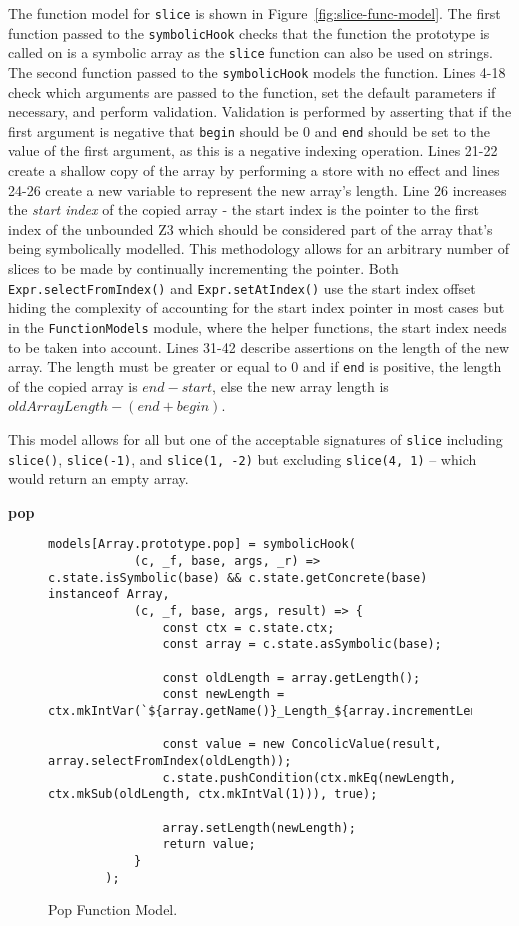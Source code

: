 \documentclass[]{final_report}
\begin{document}
The function model for \lstinline|slice| is shown in Figure~\ref{fig:slice-func-model}. The first function passed to the \lstinline|symbolicHook| checks that the function the prototype is called on is a symbolic array as the \lstinline|slice| function can also be used on strings. The second function passed to the \lstinline|symbolicHook| models the function. Lines 4-18 check which arguments are passed to the function, set the default parameters if necessary, and perform validation. Validation is performed by asserting that if the first argument is negative that \lstinline|begin| should be 0 and \lstinline|end| should be set to the value of the first argument, as this is a negative indexing operation. Lines 21-22 create a shallow copy of the array by performing a store with no effect and lines 24-26 create a new variable to represent the new array's length. Line 26 increases the \textit{start index} of the copied array - the start index is the pointer to the first index of the unbounded Z3 which should be considered part of the array that's being symbolically modelled. This methodology allows for an arbitrary number of slices to be made by continually incrementing the pointer. Both \lstinline|Expr.selectFromIndex()| and \lstinline|Expr.setAtIndex()| use the start index offset hiding the complexity of accounting for the start index pointer in most cases but in the \lstinline|FunctionModels| module, where the helper functions, the start index needs to be taken into account. Lines 31-42 describe assertions on the length of the new array. The length must be greater or equal to 0 and if \lstinline|end| is positive, the length of the copied array is $end - start$, else the new array length is $oldArrayLength - (end + begin)$.

This model allows for all but one of the acceptable signatures of \lstinline|slice| including \lstinline|slice()|, \lstinline|slice(-1)|, and \lstinline|slice(1, -2)| but excluding \lstinline|slice(4, 1)| -- which would return an empty array.

\textbf{pop}
\begin{figure}[t]
\begin{lstlisting}
models[Array.prototype.pop] = symbolicHook(
            (c, _f, base, args, _r) => c.state.isSymbolic(base) && c.state.getConcrete(base) instanceof Array,
            (c, _f, base, args, result) => {
                const ctx = c.state.ctx;
                const array = c.state.asSymbolic(base);

                const oldLength = array.getLength();
                const newLength = ctx.mkIntVar(`${array.getName()}_Length_${array.incrementLengthCounter()}`);

                const value = new ConcolicValue(result, array.selectFromIndex(oldLength));
                c.state.pushCondition(ctx.mkEq(newLength, ctx.mkSub(oldLength, ctx.mkIntVal(1))), true);
                
                array.setLength(newLength);
                return value;
            }
        );
\end{lstlisting}
\caption{\label{fig:pop-func-model} Pop Function Model.}
\end{figure}
\end{document}
